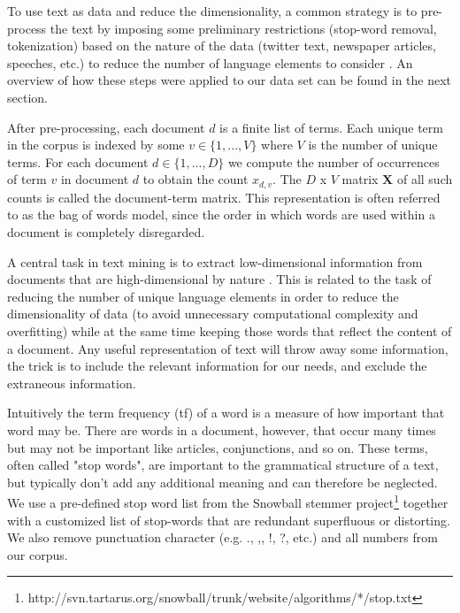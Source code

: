 \documentclass[12pt,a4paper,notitlepage]{article}
\begin{document}

To use text as data and reduce the dimensionality, a common strategy is to pre-process the text by imposing some preliminary restrictions (stop-word removal, tokenization) based on the nature of the data (twitter text, newspaper articles, speeches, etc.) to reduce the number of language elements to consider \citep{gentzkow_text_2017}. An overview of how these steps were applied to our data set can be found in the next section. 

After pre-processing, each document $d$ is a finite list of terms. Each unique term in the corpus is indexed by some $v \in \lbrace 1,...,V \rbrace$ where $V$ is the number of unique terms. For each document $d \in \lbrace 1,...,D \rbrace$ we compute the number of occurrences of term $v$ in document $d$ to obtain the count $x_{d,v}$. The $D$ x $V$ matrix $\boldsymbol{X}$ of all such counts is called the document-term matrix. This representation is often referred to as the bag of words model, since the order in which words are used within a document is completely disregarded. 

A central task in text mining is to extract low-dimensional information from documents that are high-dimensional by nature \citep{bholat_text_2015}. This is related to the task of reducing the number of unique language elements in order to reduce the dimensionality of data (to avoid unnecessary computational complexity and overfitting) while at the same time keeping those words that reflect the content of a document. Any useful representation of text will throw away some information, the trick is to include the relevant information for our needs, and exclude the extraneous information. 

Intuitively the term frequency (tf) of a word is a measure of how important that word may be. There are words in a document, however, that occur many times but may not be important like articles, conjunctions, and so on. These terms, often called "stop words", are important to the grammatical structure of a text, but typically don't add any additional meaning and can therefore be neglected. We use a pre-defined stop word list from the Snowball stemmer project\footnote{http://svn.tartarus.org/snowball/trunk/website/algorithms/*/stop.txt} together with a customized list of stop-words that are redundant superfluous or distorting. We also remove punctuation character (e.g. ., ,, !, ?, etc.) and all numbers from our corpus.  
\end{document}
